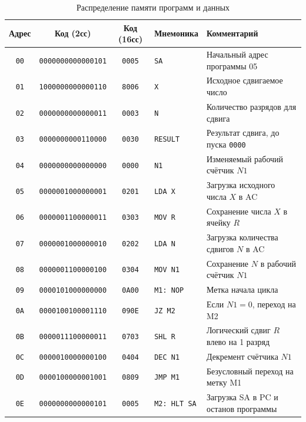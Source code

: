 \documentclass[11pt, a4paper]{article}
\begin{document}
\begin{table}[h!]
	\centering
	\caption{Распределение памяти программ и данных}
	\begin{tabular}{|c|c|c|l|l|}
		\hline
		\textbf{Адрес} & \textbf{Код (2сс)}        & \textbf{Код (16сс)} & \textbf{Мнемоника}  & \textbf{Комментарий}                     \\
		\hline
		\texttt{00}    & \texttt{0000000000000101} & \texttt{0005}       & \texttt{SA}         & Начальный адрес программы 05             \\
		\texttt{01}    & \texttt{1000000000000110} & \texttt{8006}       & \texttt{X}          & Исходное сдвигаемое число                \\
		\texttt{02}    & \texttt{0000000000000011} & \texttt{0003}       & \texttt{N}          & Количество разрядов для сдвига           \\
		\texttt{03}    & \texttt{0000000000110000} & \texttt{0030}       & \texttt{RESULT}     & Результат сдвига, до пуска \texttt{0000} \\
		\texttt{04}    & \texttt{0000000000000000} & \texttt{0000}       & \texttt{N1}         & Изменяемый рабочий счётчик $N1$          \\
		\texttt{05}    & \texttt{0000001000000001} & \texttt{0201}       & \texttt{LDA X}      & Загрузка исходного числа $X$ в AC        \\
		\texttt{06}    & \texttt{0000001100000011} & \texttt{0303}       & \texttt{MOV R}      & Сохранение числа $X$ в ячейку $R$        \\
		\texttt{07}    & \texttt{0000001000000010} & \texttt{0202}       & \texttt{LDA N}      & Загрузка количества сдвигов $N$ в AC     \\
		\texttt{08}    & \texttt{0000001100000100} & \texttt{0304}       & \texttt{MOV N1}     & Сохранение $N$ в рабочий счётчик $N1$    \\
		\texttt{09}    & \texttt{0000101000000000} & \texttt{0A00}       & \texttt{M1: NOP}    & Метка начала цикла                       \\
		\texttt{0A}    & \texttt{0000100100001110} & \texttt{090E}       & \texttt{JZ M2}      & Если $N1 = 0$, переход на M2             \\
		\texttt{0B}    & \texttt{0000011100000011} & \texttt{0703}       & \texttt{SHL R}      & Логический сдвиг $R$ влево на 1 разряд   \\
		\texttt{0C}    & \texttt{0000010000000100} & \texttt{0404}       & \texttt{DEC N1}     & Декремент счётчика $N1$                  \\
		\texttt{0D}    & \texttt{0000100000001001} & \texttt{0809}       & \texttt{JMP M1}     & Безусловный переход на метку M1          \\
		\texttt{0E}    & \texttt{0000000000000101} & \texttt{0005}       & \texttt{M2: HLT SA} & Загрузка SA в PC и останов программы     \\
		\hline
	\end{tabular}
\end{table}
\end{document}

